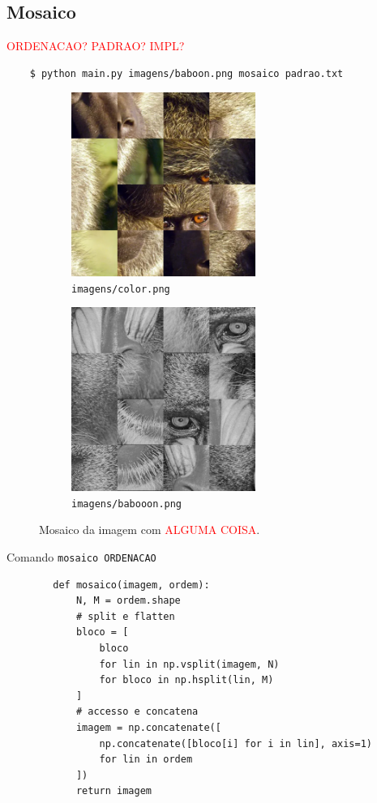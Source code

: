 \subsection{Mosaico} \label{sec:mosaico}

\textcolor{red}{ORDENACAO? PADRAO? IMPL?}

\begin{verbatim}
    $ python main.py imagens/baboon.png mosaico padrao.txt
\end{verbatim}

\begin{figure}[H]
    \centering
    \begin{subfigure}{0.45\textwidth}
        \centering
        \includegraphics[width=6cm]{resultados/colormsc.png}
        \caption{\texttt{imagens/color.png}}
    \end{subfigure}%
    \begin{subfigure}{0.45\textwidth}
        \centering
        \includegraphics[width=6cm]{resultados/baboonmsc.png}
        \caption{\texttt{imagens/babooon.png}}
        \label{fig:res:10}
    \end{subfigure}

    \caption{Mosaico da imagem com \textcolor{red}{ALGUMA COISA}.}
\end{figure}

\begin{listing}[H]
    \caption{Comando \texttt{mosaico ORDENACAO}}

    \begin{verbatim}
        def mosaico(imagem, ordem):
            N, M = ordem.shape
            # split e flatten
            bloco = [
                bloco
                for lin in np.vsplit(imagem, N)
                for bloco in np.hsplit(lin, M)
            ]
            # accesso e concatena
            imagem = np.concatenate([
                np.concatenate([bloco[i] for i in lin], axis=1)
                for lin in ordem
            ])
            return imagem
    \end{verbatim}
\end{listing}
